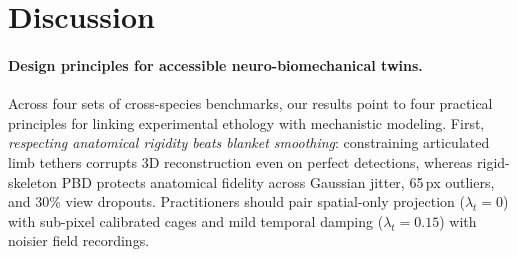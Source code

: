 \documentclass[10pt,twocolumn,letterpaper]{article}
\begin{document}
\begin{table}[t]
\centering
\caption{\textbf{Single-CPU throughput and full-LIF MaleCNS~v1.0 scaling (166,700 neurons, random Erd\H{o}s--R\'enyi vs.\ 78-neuropil modular CSR, zero GPU).}}
\label{tab:throughput}
\scriptsize
\setlength{\tabcolsep}{2.2pt}
\end{table}

\section{Discussion}

\paragraph{Design principles for accessible neuro-biomechanical twins.}
Across four sets of cross-species benchmarks, our results point to four practical principles for linking experimental ethology with mechanistic modeling. First, \emph{respecting anatomical rigidity beats blanket smoothing}: constraining articulated limb tethers corrupts 3D reconstruction even on perfect detections, whereas rigid-skeleton PBD protects anatomical fidelity across Gaussian jitter, 65\,px outliers, and 30\% view dropouts. Practitioners should pair spatial-only projection ($\lambda_t=0$) with sub-pixel calibrated cages and mild temporal damping ($\lambda_t=0.15$) with noisier field recordings.
\end{document}
